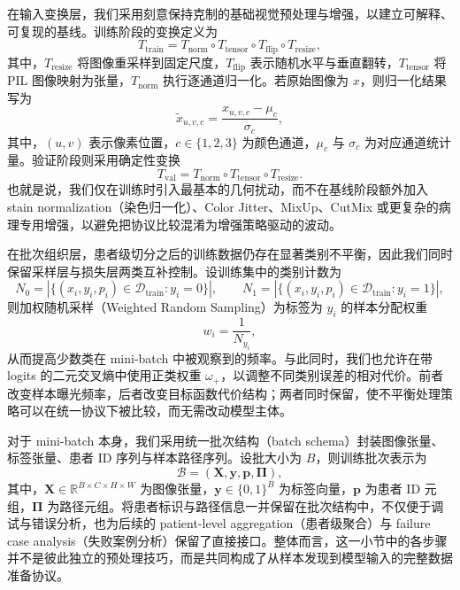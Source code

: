 在输入变换层，我们采用刻意保持克制的基础视觉预处理与增强，以建立可解释、可复现的基线。训练阶段的变换定义为
\begin{equation}
    T_{\mathrm{train}} = T_{\mathrm{norm}} \circ T_{\mathrm{tensor}} \circ T_{\mathrm{flip}} \circ T_{\mathrm{resize}},
\end{equation}
其中，$T_{\mathrm{resize}}$ 将图像重采样到固定尺度，$T_{\mathrm{flip}}$ 表示随机水平与垂直翻转，$T_{\mathrm{tensor}}$ 将 PIL 图像映射为张量，$T_{\mathrm{norm}}$ 执行逐通道归一化。若原始图像为 $x$，则归一化结果写为
\begin{equation}
    \tilde{x}_{u,v,c} = \frac{x_{u,v,c} - \mu_c}{\sigma_c},
\end{equation}
其中，$(u,v)$ 表示像素位置，$c \in \{1,2,3\}$ 为颜色通道，$\mu_c$ 与 $\sigma_c$ 为对应通道统计量。验证阶段则采用确定性变换
\begin{equation}
    T_{\mathrm{val}} = T_{\mathrm{norm}} \circ T_{\mathrm{tensor}} \circ T_{\mathrm{resize}}.
\end{equation}
也就是说，我们仅在训练时引入最基本的几何扰动，而不在基线阶段额外加入 stain normalization（染色归一化）、Color Jitter、MixUp、CutMix 或更复杂的病理专用增强，以避免把协议比较混淆为增强策略驱动的波动。

在批次组织层，患者级切分之后的训练数据仍存在显著类别不平衡，因此我们同时保留采样层与损失层两类互补控制。设训练集中的类别计数为
\begin{equation}
    N_{0} = |\{(x_i,y_i,p_i) \in \mathcal{D}_{\mathrm{train}} : y_i = 0\}|,
    \qquad
    N_{1} = |\{(x_i,y_i,p_i) \in \mathcal{D}_{\mathrm{train}} : y_i = 1\}|,
\end{equation}
则加权随机采样（Weighted Random Sampling）为标签为 $y_i$ 的样本分配权重
\begin{equation}
    w_i = \frac{1}{N_{y_i}},
\end{equation}
从而提高少数类在 mini-batch 中被观察到的频率。与此同时，我们也允许在带 logits 的二元交叉熵中使用正类权重 $\omega_{+}$，以调整不同类别误差的相对代价。前者改变样本曝光频率，后者改变目标函数代价结构；两者同时保留，使不平衡处理策略可以在统一协议下被比较，而无需改动模型主体。

对于 mini-batch 本身，我们采用统一批次结构（batch schema）封装图像张量、标签张量、患者 ID 序列与样本路径序列。设批大小为 $B$，则训练批次表示为
\begin{equation}
    \mathcal{B} = (\mathbf{X}, \mathbf{y}, \mathbf{p}, \mathbf{\Pi}),
\end{equation}
其中，$\mathbf{X} \in \mathbb{R}^{B \times C \times H \times W}$ 为图像张量，$\mathbf{y} \in \{0,1\}^{B}$ 为标签向量，$\mathbf{p}$ 为患者 ID 元组，$\mathbf{\Pi}$ 为路径元组。将患者标识与路径信息一并保留在批次结构中，不仅便于调试与错误分析，也为后续的 patient-level aggregation（患者级聚合）与 failure case analysis（失败案例分析）保留了直接接口。整体而言，这一小节中的各步骤并不是彼此独立的预处理技巧，而是共同构成了从样本发现到模型输入的完整数据准备协议。

